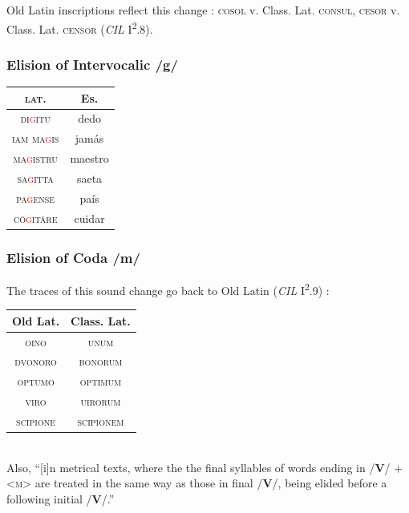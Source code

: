 \documentclass{report}[12pt]
\begin{document}
Old Latin inscriptions reflect this change \parencite[p.~17]{companion_to_latin}: \textsc{cosol} v. Class. Lat. \textsc{consul}, \textsc{cesor} v. Class. Lat. \textsc{censor} (\emph{CIL} I\textsuperscript{2}.8).

\subsubsection*{Elision of Intervocalic /g/}

\begin{tcolorbox}

\end{tcolorbox}

\begin{tabular}{c c}
  \textsc{lat.} & Es. \\
  \hline
  \textsc{di\textcolor{red}{g}itu} & dedo \\
  \textsc{iam ma\textcolor{red}{g}is} & jamás \\
  \textsc{ma\textcolor{red}{g}istru} & maestro \\
  \textsc{sa\textcolor{red}{g}itta} & saeta \\
  \textsc{pa\textcolor{red}{g}ense} & país \\
  \textsc{c\={o}\textcolor{red}{g}it\={a}re} & cuidar \\
\end{tabular}

\subsubsection*{Elision of Coda /m/}

\begin{tcolorbox}
  
\end{tcolorbox}

The traces of this sound change go back to Old Latin (\emph{CIL} I\textsuperscript{2}.9) \parencite[p.~17]{companion_to_latin}: \\
\begin{tabular}{c c}
  Old Lat. & Class. Lat. \\
  \hline
  \textsc{oino} & \textsc{unum} \\
  \textsc{dvonoro} & \textsc{bonorum} \\
  \textsc{optumo} & \textsc{optimum} \\
  \textsc{viro} & \textsc{uirorum} \\
  \textsc{scipione} & \textsc{scipionem} \\
\end{tabular} \\
Also, ``[i]n metrical texts, where the the final syllables of words ending in /\textbf{V}/ $+$ <\textsc{m}> are treated in the same way as those in final /\textbf{V}/, being elided before a following initial /\textbf{V}/.'' \parencite[p.~87]{companion_to_latin}
\end{document}
